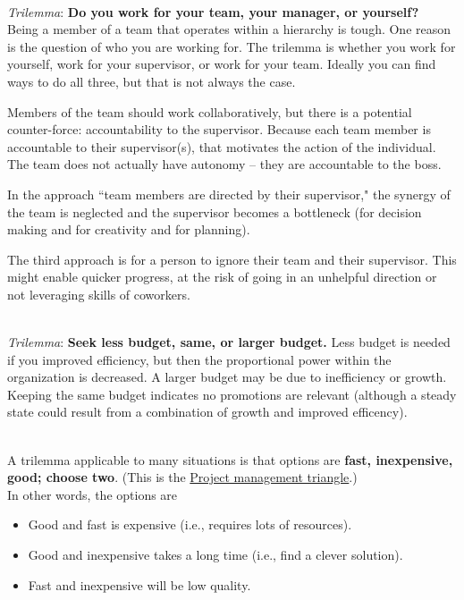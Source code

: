\ \\

\textit{Trilemma}: \textbf{Do you work for your team, your manager, or yourself?} \\
Being a member of a team that operates within a hierarchy is tough. One reason is the question of who you are working for. The trilemma is whether you work for yourself, work for your supervisor, or work for your team.  Ideally you can find ways to do all three, but that is not always the case. 

Members of the team should work collaboratively, but there is a potential counter-force: accountability to the supervisor. Because each team member is accountable to their supervisor(s), that motivates the action of the individual. The team does not actually have autonomy -- they are accountable to the boss.

In the approach ``team members are directed by their supervisor," the synergy of the team is neglected and the supervisor becomes a bottleneck (for decision making and for creativity and for planning).

The third approach is for a person to ignore their team and their supervisor. This might enable quicker progress, at the risk of going in an unhelpful direction or not leveraging skills of coworkers. 

\ \\

\textit{Trilemma}:
\textbf{Seek less budget, same, or larger budget.} 
Less budget is needed if you improved efficiency, but then the proportional power within the organization is decreased. A larger budget may be due to inefficiency or growth. Keeping the same budget indicates no promotions are relevant (although a steady state could result from a combination of growth and improved efficency). 

\ \\

A trilemma applicable to many situations is that options are \textbf{fast, inexpensive, good; choose two}. 
(This is the \href{https://en.wikipedia.org/wiki/Project_management_triangle}{Project management triangle}.) 
\\
In other words, the options are
\begin{itemize}
    \item Good and fast is expensive (i.e., requires lots of resources).
    \item Good and inexpensive takes a long time (i.e., find a clever solution).
    \item Fast and inexpensive will be low quality.
\end{itemize}

